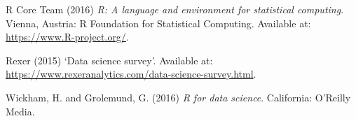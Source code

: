 \documentclass[]{tufte-handout}
\begin{document}
\hypertarget{refs}{}
\leavevmode\hypertarget{ref-R-base}{}%
R Core Team (2016) \emph{R: A language and environment for statistical
computing}. Vienna, Austria: R Foundation for Statistical Computing.
Available at: \url{https://www.R-project.org/}.

\leavevmode\hypertarget{ref-rexer2015}{}%
Rexer (2015) `Data science survey'. Available at:
\url{https://www.rexeranalytics.com/data-science-survey.html}.

\leavevmode\hypertarget{ref-WickhamR4DS}{}%
Wickham, H. and Grolemund, G. (2016) \emph{R for data science}.
California: O'Reilly Media.
\end{document}
